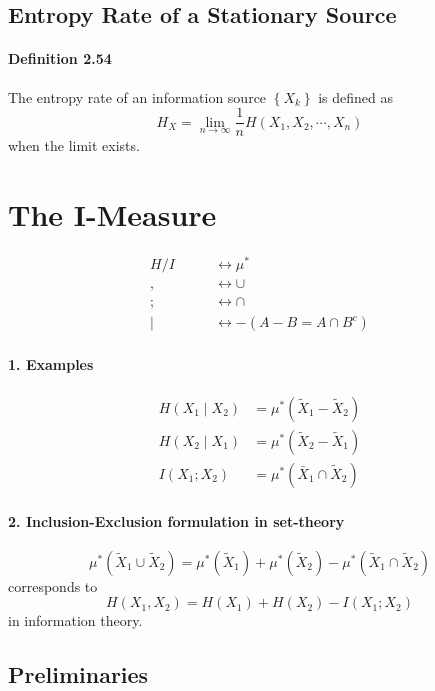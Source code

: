 \documentclass[8pt]{article}
\begin{document}
\subsection{Entropy Rate of a Stationary Source}
\paragraph{Definition 2.54} The entropy rate of an information source $\left\{X_{k}\right\}$ is defined as
$$
H_{X}=\lim _{n \rightarrow \infty} \frac{1}{n} H\left(X_{1}, X_{2}, \cdots, X_{n}\right)
$$
when the limit exists.


\newpage
\section{The I-Measure}
$$
\begin{aligned}
H / I \quad & \quad \leftrightarrow \mu^{*} \\
, \quad & \quad \leftrightarrow \cup \\
; \quad & \quad \leftrightarrow  \cap \\
\mid \quad & \quad \leftrightarrow -\left(A-B=A \cap B^{c}\right)
\end{aligned}
$$

\paragraph{1. Examples}
$$
\begin{aligned}
H\left(X_{1} \mid X_{2}\right) &=\mu^{*}\left(\tilde{X}_{1}-\tilde{X}_{2}\right) \\
H\left(X_{2} \mid X_{1}\right) &=\mu^{*}\left(\tilde{X}_{2}-\tilde{X}_{1}\right) \\
I\left(X_{1} ; X_{2}\right) &=\mu^{*}\left(\bar{X}_{1} \cap \tilde{X}_{2}\right)
\end{aligned}
$$

\paragraph{2. Inclusion-Exclusion formulation in set-theory}
$$
\mu^{*}\left(\tilde{X}_{1} \cup \tilde{X}_{2}\right)=\mu^{*}\left(\tilde{X}_{1}\right)+\mu^{*}\left(\tilde{X}_{2}\right)-\mu^{*}\left(\tilde{X}_{1} \cap \tilde{X}_{2}\right)
$$
corresponds to
$$
H\left(X_{1}, X_{2}\right)=H\left(X_{1}\right)+H\left(X_{2}\right)-I\left(X_{1} ; X_{2}\right)
$$
in information theory.

\subsection{Preliminaries}
\end{document}

